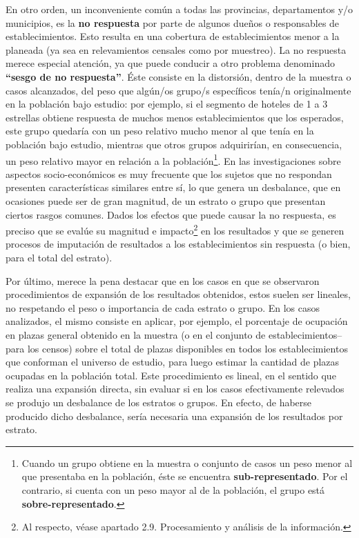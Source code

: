 \documentclass[
]{book}
\begin{document}
En otro orden, un inconveniente común a todas las provincias, departamentos y/o municipios, es la \textbf{no respuesta} por parte de algunos dueños o responsables de establecimientos. Esto resulta en una cobertura de establecimientos menor a la planeada (ya sea en relevamientos censales como por muestreo). La no respuesta merece especial atención, ya que puede conducir a otro problema denominado \textbf{``sesgo de no respuesta''}. Éste consiste en la distorsión, dentro de la muestra o casos alcanzados, del peso que algún/os grupo/s específicos tenía/n originalmente en la población bajo estudio: por ejemplo, si el segmento de hoteles de 1 a 3 estrellas obtiene respuesta de muchos menos establecimientos que los esperados, este grupo quedaría con un peso relativo mucho menor al que tenía en la población bajo estudio, mientras que otros grupos adquirirían, en consecuencia, un peso relativo mayor en relación a la población\footnote{Cuando un grupo obtiene en la muestra o conjunto de casos un peso menor al que presentaba en la población, éste se encuentra \textbf{sub-representado}. Por el contrario, si cuenta con un peso mayor al de la población, el grupo está \textbf{sobre-representado}.}. En las investigaciones sobre aspectos socio-económicos es muy frecuente que los sujetos que no respondan presenten características similares entre sí, lo que genera un desbalance, que en ocasiones puede ser de gran magnitud, de un estrato o grupo que presentan ciertos rasgos comunes. Dados los efectos que puede causar la no respuesta, es preciso que se evalúe su magnitud e impacto\footnote{Al respecto, véase apartado 2.9. Procesamiento y análisis de la información.} en los resultados y que se generen procesos de imputación de resultados a los establecimientos sin respuesta (o bien, para el total del estrato).

Por último, merece la pena destacar que en los casos en que se observaron procedimientos de expansión de los resultados obtenidos, estos suelen ser lineales, no respetando el peso o importancia de cada estrato o grupo. En los casos analizados, el mismo consiste en aplicar, por ejemplo, el porcentaje de ocupación en plazas general obtenido en la muestra (o en el conjunto de establecimientos--para los censos) sobre el total de plazas disponibles en todos los establecimientos que conforman el universo de estudio, para luego estimar la cantidad de plazas ocupadas en la población total. Este procedimiento es lineal, en el sentido que realiza una expansión directa, sin evaluar si en los casos efectivamente relevados se produjo un desbalance de los estratos o grupos. En efecto, de haberse producido dicho desbalance, sería necesaria una expansión de los resultados por estrato.
\end{document}
